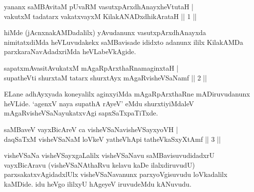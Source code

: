 
\centerline{}


\begin{shl}
yananx saMBAvitaM pUvaRM vasutxpArxdhAnayxheVtutaH | \\
vakutxM tadatarx vakatxvayxM KilakANADxdhikArataH \hfill|| 1 || 
\end{shl}

\begin{artha}
hiMde (jAcnxnakAMDadalilx) yAvudanunx vasutxpArxdhAnayxda 
nimitatxdiMda heVLuvudakekx saMBavisade ididxto adanunx ililx 
KilakAMDa parxkaraNavAdadxriMda heVLabeVkAgide.
\end{artha}

\begin{shl}
sapatxmAvasitAvukatxM mAgaRpArxthaRnamaginxtaH | \\
supatheVti shurxtaM tatarx shurxtAyx mAgaRvisheVSaNamf \hfill|| 2 || 
\end{shl}

\begin{artha}
ELane adhAyxyada koneyalilx aginxyiMda mAgaRpArxthaRne mADiruvudanunx 
heVLide. `agenxV naya supathA rAyeV' eMdu shurxtiyiMdaleV mAgaRvisheVSaNayukatxvAgi sapxSaTxpaTiTxde.
\end{artha}


\begin{shl}
\footnotemark[1]saMBaveV vayxBicAreV ca visheVSaNavisheVSayxyoVH | \\
daqSaTxM visheVSaNaM loVkeV yatheVhApi tatheVkaSxyXtAmf \hfill|| 3 || 
\end{shl}

\begin{artha}
visheVSaNa visheVSayxgaLalilx visheVSaNavu saMBavisuvudidadxrU 
vayxBicAravu (visheVSaNAthaRvu kelavu kaDe ilalxdiruvudU) 
parxsakatxvAgidadxlUlx visheVSaNavanunx parxyoVgisuvudu loVkadalilx 
kaMDide. idu heVgo ililxyU hAgeyeV iruvudeMdu kANuvudu.
\end{artha}

